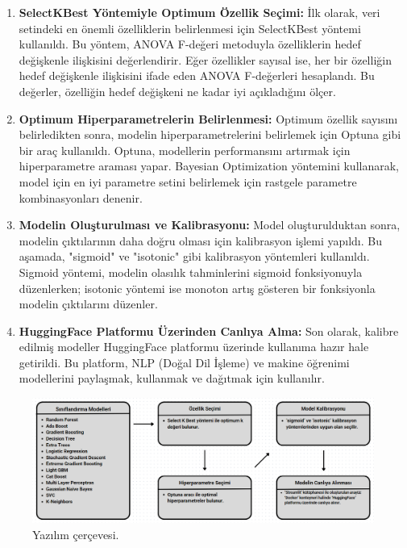 \begin{enumerate}
\item \textbf{SelectKBest Yöntemiyle Optimum Özellik Seçimi:} İlk olarak, veri setindeki en önemli özelliklerin belirlenmesi için SelectKBest yöntemi kullanıldı. Bu yöntem, ANOVA F-değeri metoduyla özelliklerin hedef değişkenle ilişkisini değerlendirir. Eğer özellikler sayısal ise, her bir özelliğin hedef değişkenle ilişkisini ifade eden ANOVA F-değerleri hesaplandı. Bu değerler, özelliğin hedef değişkeni ne kadar iyi açıkladığını ölçer.

\item \textbf{Optimum Hiperparametrelerin Belirlenmesi:} Optimum özellik sayısını belirledikten sonra, modelin hiperparametrelerini belirlemek için Optuna gibi bir araç kullanıldı. Optuna, modellerin performansını artırmak için hiperparametre araması yapar. Bayesian Optimization yöntemini kullanarak, model için en iyi parametre setini belirlemek için rastgele parametre kombinasyonları denenir.

\item \textbf{Modelin Oluşturulması ve Kalibrasyonu:} Model oluşturulduktan sonra, modelin çıktılarının daha doğru olması için kalibrasyon işlemi yapıldı. Bu aşamada, "sigmoid" ve "isotonic" gibi kalibrasyon yöntemleri kullanıldı. Sigmoid yöntemi, modelin olasılık tahminlerini sigmoid fonksiyonuyla düzenlerken; isotonic yöntemi ise monoton artış gösteren bir fonksiyonla modelin çıktılarını düzenler.

\item \textbf{HuggingFace Platformu Üzerinden Canlıya Alma:} Son olarak, kalibre edilmiş modeller HuggingFace platformu üzerinde kullanıma hazır hale getirildi. Bu platform, NLP (Doğal Dil İşleme) ve makine öğrenimi modellerini paylaşmak, kullanmak ve dağıtmak için kullanılır.
\end{enumerate}

\begin{figure}[h]
  \centering
  \includegraphics[width=1.0\textwidth]{cerceve.png}
  \caption{Yazılım çerçevesi.}
  \label{fig:ornek_resim}
\end{figure}

